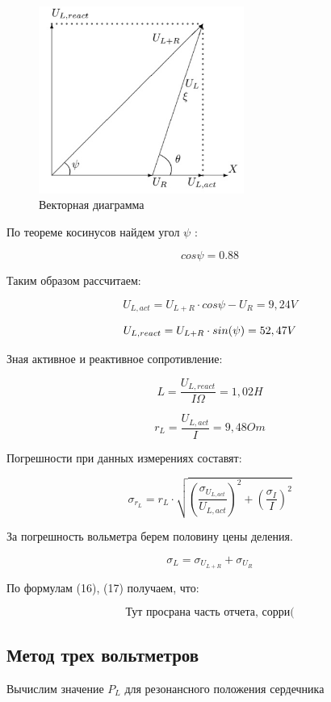 \documentclass[a4paper, 14pt]{extarticle}%
\begin{document}
\begin{figure}[h]
	\includegraphics[width = 0.6\textwidth]{pics/vect_diag.jpg}
	\caption{Векторная диаграмма}
	\label{Pic1}
\end{figure}


По теореме косинусов найдем угол $ {\psi} $ :


$$cos\psi = 0.88$$


Таким образом рассчитаем:

$$
U_{L,act} = {U_{L+R}}\cdot {cos\psi} - U_R = 9,24 V
$$

$$
U_{L,react} = U_{L+R}\cdot sin(\psi) = 52,47 \vspace{0.2cm} V
$$

Зная активное и реактивное сопротивление:

$$
L = \frac{U_{L,react}}{{I}{\Omega}} = 1,02 H
$$

$$
r_L = \frac{U_{L,act}}{I} = 9,48 Om
$$

Погрешности при данных измерениях составят:

\begin{equation}\label{}
\sigma_{r_L} = r_L \cdot \sqrt{(\frac{\sigma_{U_{L,act}}}{U_{L, act}})^2 + (\frac{\sigma_I}{I})^2}
\end{equation}

За погрешность вольметра берем половину цены деления.

\begin{equation}\label{}
\sigma_{L} = \sigma_{U_{L+R}} + \sigma_{U_R}
\end{equation}

По формулам (16), (17) получаем, что:

\[ \textbf{Тут просрана часть отчета, сорри(} \]

\subsection{Метод трех вольтметров} 
Вычислим значение $ P_{L} $ для резонансного положения сердечника 
\end{document}
